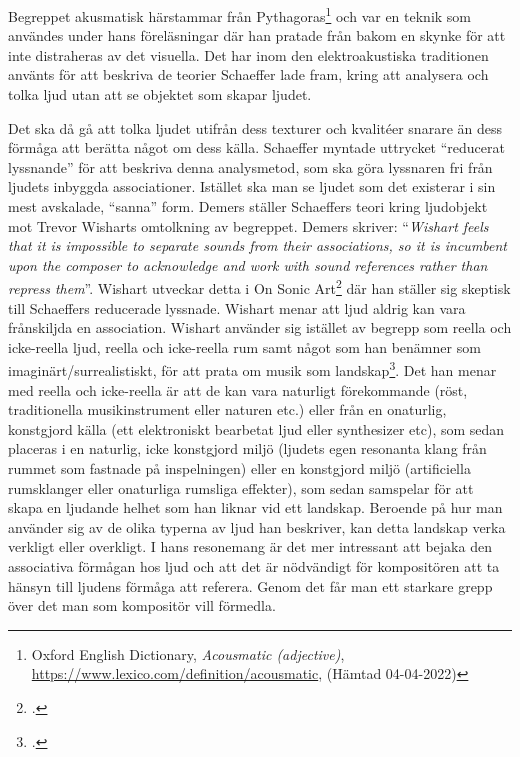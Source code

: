 \documentclass{article}
\begin{document}
Begreppet akusmatisk härstammar från Pythagoras\footnote{Oxford English Dictionary, \emph{Acousmatic
(adjective)}, \url{https://www.lexico.com/definition/acousmatic}, (Hämtad 04-04-2022)} och var en teknik som
användes under hans föreläsningar där han pratade från bakom en skynke för att inte distraheras av det
visuella. Det har inom den elektroakustiska traditionen använts för att beskriva de teorier Schaeffer lade
fram, kring att analysera och tolka ljud utan att se objektet som skapar ljudet.

Det ska då gå att tolka ljudet utifrån dess texturer och kvalitéer snarare än dess förmåga att berätta något
om dess källa. Schaeffer myntade uttrycket ``reducerat lyssnande'' för att beskriva denna analysmetod, som ska
göra lyssnaren fri från ljudets inbyggda associationer. Istället ska man se ljudet som det existerar i sin
mest avskalade, ``sanna'' form. Demers ställer Schaeffers teori kring ljudobjekt mot Trevor Wisharts
omtolkning av begreppet. Demers skriver: ``\emph{Wishart feels that it is impossible to separate sounds from
their associations, so it is incumbent upon the composer to acknowledge and work with sound references rather
than repress them}''. Wishart utveckar detta i On Sonic Art\footcite{TrevorWishart} där han ställer sig
skeptisk till Schaeffers reducerade lyssnade. Wishart menar att ljud aldrig kan vara frånskiljda en
association. Wishart använder sig istället av begrepp som reella och icke-reella ljud, reella och icke-reella
rum samt något som han benämner som imaginärt/surrealistiskt, för att prata om musik som
landskap\footcite[144-147]{TrevorWishart}. Det han menar med reella och icke-reella är att de kan vara
naturligt förekommande (röst, traditionella musikinstrument eller naturen etc.) eller från en onaturlig,
konstgjord källa (ett elektroniskt bearbetat ljud eller synthesizer etc), som sedan placeras i en naturlig,
icke konstgjord miljö (ljudets egen resonanta klang från rummet som fastnade på inspelningen) eller en
konstgjord miljö (artificiella rumsklanger eller onaturliga rumsliga effekter), som sedan samspelar för att
skapa en ljudande helhet som han liknar vid ett landskap. Beroende på hur man använder sig av de olika typerna
av ljud han beskriver, kan detta landskap verka verkligt eller overkligt. I hans resonemang är det mer
intressant att bejaka den associativa förmågan hos ljud och att det är nödvändigt för kompositören att ta
hänsyn till ljudens förmåga att referera. Genom det får man ett starkare grepp över det man som kompositör
vill förmedla.
\end{document}
